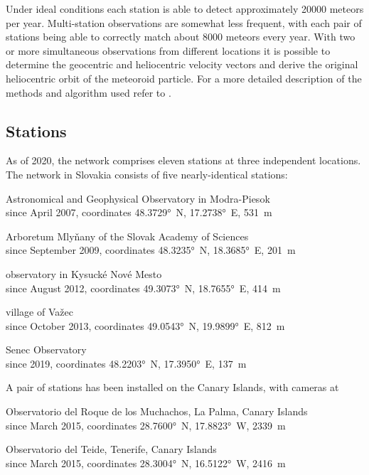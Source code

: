         Under ideal conditions each station is able to detect approximately 20000 meteors per year.
        Multi-station observations are somewhat less frequent, with each pair of stations being able
        to correctly match about 8000 meteors every year.
        With two or more simultaneous observations from different locations it is possible to determine
        the geocentric and heliocentric velocity vectors and derive the original heliocentric orbit of the meteoroid particle.
        For a more detailed description of the methods and algorithm used refer to \citet{fero?} .

    \subsection{Stations} \label{iAs}
        As of 2020, the network comprises eleven stations at three independent locations.
        The network in Slovakia consists of five nearly-identical stations:
        \begin{description}[leftmargin = 25mm]
            \item[AGO]      Astronomical and Geophysical Observatory in Modra-Piesok\\
                            since April 2007, coordinates \ang{48.3729}~N, \ang{17.2738}~E, \SI{531}{\metre}
            \item[ARBO]     Arboretum Mlyňany of the Slovak Academy of Sciences\\
                            since September 2009, coordinates \ang{48.3235}~N, \ang{18.3685}~E, \SI{201}{\metre}
            \item[KNM]      observatory in Kysucké Nové Mesto\\
                            since August 2012, coordinates \ang{49.3073}~N, \ang{18.7655}~E, \SI{414}{\metre}
            \item[VAZEC]    village of Važec\\
                            since October 2013, coordinates \ang{49.0543}~N, \ang{19.9899}~E, \SI{812}{\metre}
            \item[SENEC]    Senec Observatory\\
                            since 2019, coordinates \ang{48.2203}~N, \ang{17.3950}~E, \SI{137}{\metre} 
        \end{description}

        A pair of stations has been installed on the Canary Islands, with cameras at
        \begin{description}[leftmargin = 25mm]
            \item[LP]       Observatorio del Roque de los Muchachos, La Palma, Canary Islands\\
                            since March 2015, coordinates \ang{28.7600}~N, \ang{17.8823}~W, \SI{2339}{\metre}
            \item[TE]       Observatorio del Teide, Tenerife, Canary Islands\\
                            since March 2015, coordinates \ang{28.3004}~N, \ang{16.5122}~W, \SI{2416}{\metre}
        \end{description}

